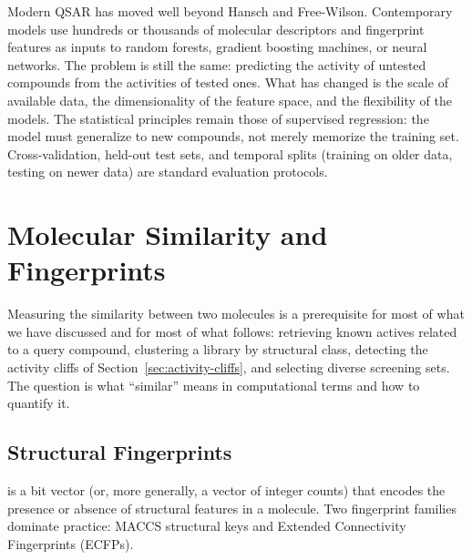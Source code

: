 Modern QSAR has moved well beyond Hansch and Free-Wilson. Contemporary models use hundreds or thousands of molecular descriptors and fingerprint features as inputs to random forests, gradient boosting machines, or neural networks. The problem is still the same: predicting the activity of untested compounds from the activities of tested ones. What has changed is the scale of available data, the dimensionality of the feature space, and the flexibility of the models. The statistical principles remain those of supervised regression: the model must generalize to new compounds, not merely memorize the training set. Cross-validation, held-out test sets, and temporal splits (training on older data, testing on newer data) are standard evaluation protocols.


\section{Molecular Similarity and Fingerprints}
\label{sec:mol-similarity}

Measuring the similarity between two molecules is a prerequisite for most of what we have discussed and for most of what follows: retrieving known actives related to a query compound, clustering a library by structural class, detecting the activity cliffs of Section~\ref{sec:activity-cliffs}, and selecting diverse screening sets. The question is what ``similar'' means in computational terms and how to quantify it.


\subsection{Structural Fingerprints}
\label{sec:fingerprints}

 is a bit vector (or, more generally, a vector of integer counts) that encodes the presence or absence of structural features in a molecule. Two fingerprint families dominate practice: MACCS structural keys and Extended Connectivity Fingerprints (ECFPs).


